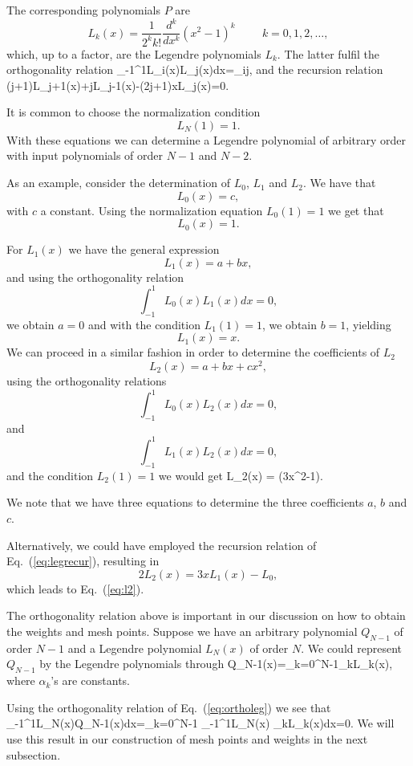 The corresponding polynomials $P$ are
\[
   L_k(x)=\frac{1}{2^kk!}\frac{d^k}{dx^k}(x^2-1)^k \hspace{1cm} k=0,1,2,\dots,
\]
which, up to a factor, are the Legendre polynomials $L_k$. 
The latter fulfil the orthogonality relation
\be
  \int_{-1}^1L_i(x)L_j(x)dx=\delta_{ij},
  \label{eq:ortholeg}
\ee
and the recursion relation
\be
  (j+1)L_{j+1}(x)+jL_{j-1}(x)-(2j+1)xL_j(x)=0.
  \label{eq:legrecur}
\ee


It is common to choose the normalization condition
\[
    L_N(1)=1.
\]
With these equations we can determine a Legendre polynomial of arbitrary order
with input polynomials of order $N-1$ and $N-2$. 

As an example, consider the determination of $L_0$, $L_1$ and $L_2$. 
We have that
\[
   L_0(x) = c,
\]
with $c$ a constant. Using the normalization equation $L_0(1)=1$
we get that
\[
   L_0(x) = 1.
\]

For $L_1(x)$ we have the general expression 
\[
   L_1(x) = a+bx,
\]
and using the orthogonality relation
\[
  \int_{-1}^1L_0(x)L_1(x)dx=0,
\]
we obtain $a=0$ and with the condition $L_1(1)=1$, we obtain $b=1$, yielding
\[
   L_1(x) = x.
\]
We can proceed in a similar fashion in order to determine
the coefficients of $L_2$
\[
   L_2(x) = a+bx+cx^2,
\]
using the orthogonality relations
\[
  \int_{-1}^1L_0(x)L_2(x)dx=0,
\]
and 
\[
  \int_{-1}^1L_1(x)L_2(x)dx=0,
\]
and the condition
$L_2(1)=1$ we would get 
\be
   L_2(x) = \left(3x^2-1\right).
   \label{eq:l2}
\ee

We note that we have three equations to determine the three coefficients
$a$, $b$ and $c$.

Alternatively, we could have 
employed the recursion relation of Eq.~(\ref{eq:legrecur}), resulting in
\[
   2L_2(x)=3xL_1(x)-L_0,
\]
which leads to Eq.~(\ref{eq:l2}).

The orthogonality relation above is important in our discussion
on how to obtain the weights and mesh points. Suppose we have an arbitrary
polynomial $Q_{N-1}$ of order $N-1$ and a Legendre polynomial $L_N(x)$ of
order $N$. We could represent $Q_{N-1}$ 
by the Legendre polynomials through 
\be
   Q_{N-1}(x)=\sum_{k=0}^{N-1}\alpha_kL_{k}(x),
   \label{eq:legexpansion}
\ee
where $\alpha_k$'s are constants.  

Using the orthogonality relation of Eq.~(\ref{eq:ortholeg}) we see that
\be
  \int_{-1}^1L_N(x)Q_{N-1}(x)dx=\sum_{k=0}^{N-1} \int_{-1}^1L_N(x) \alpha_kL_{k}(x)dx=0.
  \label{eq:ortholeg2}
\ee
We will use this result in our construction of mesh points and weights 
in the next subsection.
 
